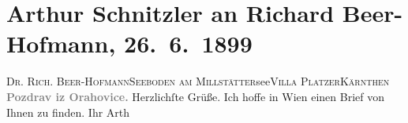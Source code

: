 

         
         \renewcommand{\erwaehntePersonen}{Personen: Richard Beer-Hofmann}
         \renewcommand{\erwaehnteOrte}{Orte: Kärnten, Orahovica, Seeboden, Villa Platzer, Wien}
         \renewcommand{\erwaehnteWerke}{}
               \section[Arthur Schnitzler an Richard Beer-Hofmann, 26. 6. 1899]{ Arthur Schnitzler an Richard Beer-Hofmann, 26. 6. 1899}\nopagebreak{}\rehead{ }\begin{ledgroupsized}[t]{13cm}\normalsize\beginnumbering \toendnotes[C]{\smallbreak\pagebreak[2]} 
\pstart{}{\pb}\textsc{Dr. Rich. Beer-Hofmann}\pend{}\pstart{}\textsc{Seeboden am Millstätter}see\pend{}\pstart{}\textsc{Villa Platzer}\pend{}\pstart{}\textsc{Kärnthen}\pend{}{\bigskip}\pstart
           \noindent{}\centering{}\textcolor{gray}{\textbf{{\pb}Pozdrav iz Orahovice.}}\pend
           \pstart
           {\pb}Herzlichſte Grüße. Ich hoffe in Wien einen Brief von Ihnen zu finden. Ihr \spacefill\mbox{Arth}\pend
           
         
         \endnumbering{}\end{ledgroupsized}  \newcommand{\dateiname}{L00930}\newcommand{\titel}{Arthur Schnitzler an Richard Beer-Hofmann, 26. 6. 1899}\newcommand{\editorInnen}{Martin Anton Müller und Gerd-Hermann Susen}
      
